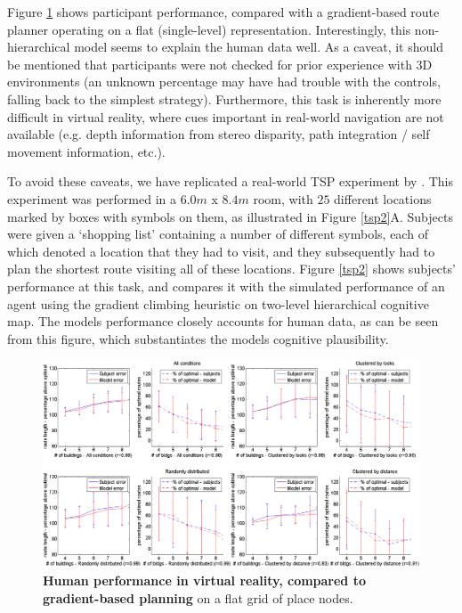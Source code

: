 Figure \ref{tsp} shows participant performance, compared with a gradient-based route planner operating on a flat (single-level) representation. Interestingly, this non-hierarchical model seems to explain the human data well. As a caveat, it should be mentioned that participants were not checked for prior experience with 3D environments (an unknown percentage may have had trouble with the controls, falling back to the simplest strategy). Furthermore, this task is inherently more difficult in virtual reality, where cues important in real-world navigation are not available (e.g. depth information from stereo disparity, path integration / self movement information, etc.).

To avoid these caveats, we have replicated a real-world TSP experiment by \citep{Wiener2009}. This experiment was performed in a $6.0m$ x $8.4m$ room, with $25$ different locations marked by boxes with symbols on them, as illustrated in Figure \ref{tsp2}A. Subjects were given a `shopping list' containing a number of different symbols, each of which denoted a location that they had to visit, and they subsequently had to plan the shortest route visiting all of these locations. Figure \ref{tsp2} shows subjects' performance at this task, and compares it with the simulated performance of an agent using the gradient climbing heuristic on two-level hierarchical cognitive map. The models performance closely  accounts for human data, as  can  be  seen  from  this  figure,  which  substantiates  the  models  cognitive plausibility.


\begin{figure}[!ht]
	\begin{center}
		\includegraphics[width=\textwidth]{img/tsperrors2}
	\end{center}
	\caption{
		{\bf Human performance in virtual reality, compared to gradient-based planning} on a flat grid of place nodes. 
	}
	\label{tsp}
\end{figure}

